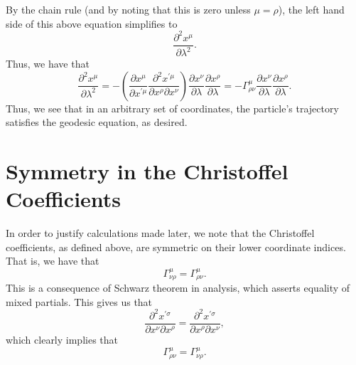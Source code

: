\documentclass[12pt]{article}
\theoremstyle{definition}
\theoremstyle{remark}
\begin{document}
	By the chain rule (and by noting that this is zero unless $\mu = \rho$), the left hand side of this above equation simplifies to 
		\[
		\frac{ \partial^2 x^{ \mu } }{ \partial \lambda^2 }.
		\]
	Thus, we have that 
		\[
		\frac{ \partial^2 x^{ \mu } }{ \partial \lambda^2 }
		= 
		-
		\left( 
		\frac{ \partial x^{ \mu } }{ \partial x^{ \prime \mu } }
		\frac{ \partial^2 x^{ \prime \mu } }{\partial x^{ \rho } \partial x^{ \nu } }
		\right)
		\frac{ \partial x^{ \nu } }{ \partial \lambda }
		\frac{ \partial x^{ \rho } }{\partial \lambda }
		=
		-
		\Gamma^{\mu}_{\rho \nu} 
		\frac{ \partial x^{ \nu } }{ \partial \lambda }
		\frac{ \partial x^{ \rho } }{\partial \lambda }.
		\]
	Thus, we see that in an arbitrary set of coordinates, the particle's trajectory satisfies the geodesic equation, as desired.  

\section{Symmetry in the Christoffel Coefficients}
	In order to justify calculations made later, we note that the Christoffel coefficients, as defined above, are symmetric on their lower coordinate indices.  That is, we have that 
		\[
		\Gamma^{ \mu }_{ \nu \rho } 
		= 
		\Gamma^{ \mu }_{ \rho \nu }.
		\]
	This is a consequence of Schwarz theorem in analysis, which asserts equality of mixed partials.  This gives us that 
		\[
		\frac{ \partial^2 x^{ \prime \sigma } }{ \partial x^{ \nu }  \partial x^{ \rho } } 
		=
		\frac{ \partial^2 x^{ \prime \sigma } }{ \partial x^{ \rho }  \partial x^{ \nu } },
		\]
	which clearly implies that 
		\[
		\Gamma_{ \rho \nu }^{ \mu } = \Gamma_{ \nu \rho }^{ \mu } .
		\]
\end{document}
